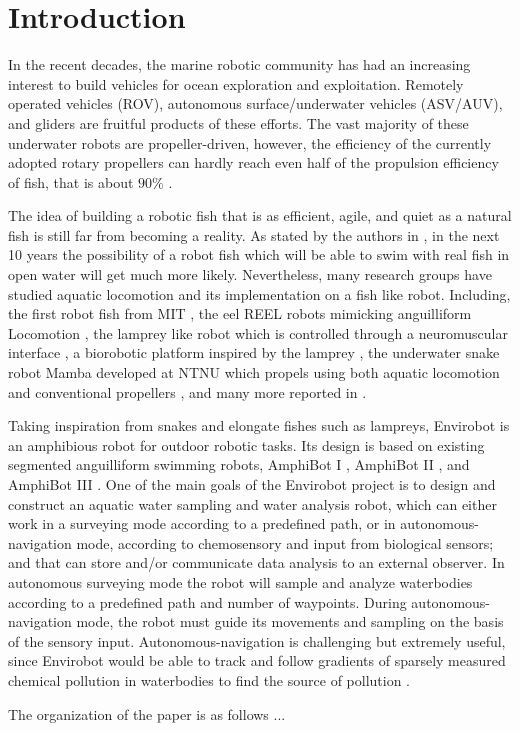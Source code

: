 \section{Introduction}

In the recent decades, the marine robotic community has  had an increasing interest to build vehicles for ocean exploration and exploitation. Remotely operated vehicles (ROV), autonomous surface/underwater vehicles (ASV/AUV), and gliders are fruitful products of these efforts. The vast majority of these
underwater robots are  propeller-driven, however, the efficiency of the currently adopted rotary propellers can
hardly reach even half of the propulsion efficiency of fish, that is about $90\%$ \cite{robotfish2015}.

The idea of building a robotic fish that is as efficient, agile, and quiet
as a natural fish is still far from becoming a reality. As stated  by 
the authors in \cite{robotfish2015}, in the next 10 years the possibility 
of a robot fish which will be able to swim with real fish in 
open water will get much more likely. Nevertheless, many research 
groups have studied aquatic locomotion and its implementation on a fish 
like robot. 
Including, the first robot fish from MIT \cite{barrett1988propulsive},  
the eel REEL robots  mimicking  anguilliform Locomotion \cite{McIsaac}, 
the lamprey like robot which is controlled through a neuromuscular interface \cite{Westphal2011}, 
a biorobotic platform
inspired by the lamprey \cite{Stefanini2012}, 
 the underwater snake robot Mamba developed at NTNU which propels using both aquatic locomotion and conventional propellers \cite{Liljeback2014}, and many more reported in \cite{robotfish2015}.


Taking inspiration from snakes and elongate fishes such as lampreys, 
Envirobot is an amphibious robot for outdoor robotic tasks. Its design 
is based on existing segmented anguilliform swimming robots, AmphiBot I 
\cite{crespi2005amphibot},  AmphiBot II \cite{crespi2006amphibot}, and 
AmphiBot III \cite{porez2014}. One of the main goals of the Envirobot 
project \cite{envirobot} is to design and construct an aquatic water 
sampling and water analysis robot, which can either work in a surveying 
mode according to a predefined path, or in autonomous-navigation mode, 
according to chemosensory and input from biological sensors; and that can 
store and/or communicate data analysis to an external observer. In 
autonomous surveying mode  the robot will sample and analyze waterbodies 
according to a predefined path and number of waypoints. During 
autonomous-navigation mode, the robot must guide its movements and sampling on the 
basis of the sensory input.  Autonomous-navigation is challenging but extremely 
useful, since Envirobot would be able to track and follow gradients 
of sparsely measured chemical pollution in waterbodies to find the 
source of pollution \cite{vergassola07,bayat2016}. 

The organization of the paper is as follows ...

